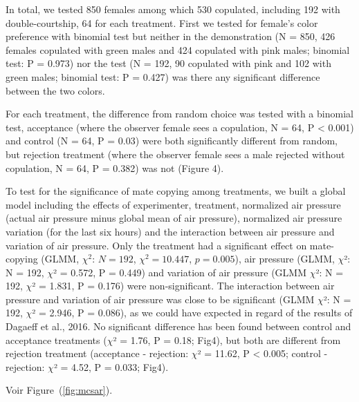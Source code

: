 \documentclass[a4paper, 12pt]{article}
\begin{document}
	In total, we tested 850 females among which 530 copulated, including 192 with double-courtship, 64 for each treatment. First we tested for female's color preference with binomial test but neither in the demonstration (N = 850, 426 females copulated with green males and 424 copulated with pink males; binomial test: P = 0.973) nor the test (N = 192, 90 copulated with pink and 102 with green males; binomial test: P = 0.427) was there any significant difference between the two colors.

	For each treatment, the difference from random choice was tested with a binomial test, acceptance (where the observer female sees a copulation, N = 64, P {\textless} 0.001) and control (N = 64, P = 0.03) were both significantly different from random, but rejection treatment (where the observer female sees a male rejected without copulation, N = 64, P = 0.382) was not (Figure 4).

	To test for the significance of mate copying among treatments, we built a global model including the effects of experimenter, treatment, normalized air pressure (actual air pressure minus global mean of air pressure), normalized air pressure variation (for the last six hours) and the interaction between air pressure and variation of air pressure. Only the treatment had a significant effect on mate-copying (GLMM, $\chi^2$: $N = 192$, $\chi^2 = 10.447$, $p = 0.005$), air pressure (GLMM, $\chi $²: N = 192, $\chi $² = 0.572, P = 0.449) and variation of air pressure (GLMM $\chi $²: N = 192, $\chi $² = 1.831, P = 0.176) were non-significant. The interaction between air pressure and variation of air pressure was close to be significant (GLMM $\chi $²: N = 192, $\chi $² = 2.946, P = 0.086), as we could have expected in regard of the results of Dagaeff et al., 2016. No significant difference has been found between control and acceptance treatments ($\chi $² = 1.76, P = 0.18; Fig4), but both are different from rejection treatment (acceptance - rejection: $\chi $² = 11.62, P {\textless} 0.005; control - rejection: $\chi $² = 4.52, P = 0.033; Fig4).
	
	Voir Figure~(\ref{fig:mcsar}).




\clearpage
\newrefcontext[sorting=nyt] %
\printbibliography
\end{document}
